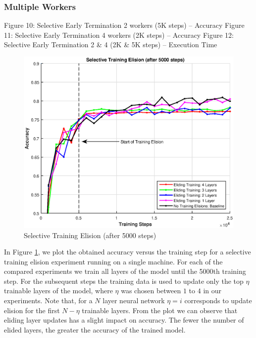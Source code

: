 \subsubsection{Multiple Workers}
Figure 10: Selective Early Termination 2 workers (5K steps) -- Accuracy 
Figure 11: Selective Early Termination 4 workers (2K steps) -- Accuracy
Figure 12: Selective Early Termination 2 \& 4 (2K \& 5K steps) -- Execution Time
\begin{figure}[t]
	\centering
	\includegraphics[width=0.8\columnwidth]{figures/approx.eps}
	\caption{Selective Training Elision (after 5000 steps)}
	\label{fig:approx}
\end{figure}

In Figure \ref{fig:approx}, we plot the obtained accuracy versus the training step for a selective training elision experiment running on a single machine. For each of the compared experiments we train all layers of the model until the 5000th training step. For the subsequent steps the training data is used to update only the top $\eta$ trainable layers of the model, where $\eta$ was chosen between $1$ to $4$ in our experiments. Note that, for a $N$ layer neural network $\eta=i$ corresponds to update elision for the first $N-\eta$ trainable layers. From the plot we can observe that eliding layer updates has a slight impact on accuracy. The fewer the number of elided layers, the greater the accuracy of the trained model. 

